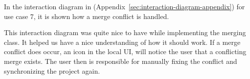 In the interaction diagram in (Appendix~\ref{sec:interaction-diagram-appendix}) for use case 7, it is shown how a merge conflict is handled. 

This interaction diagram was quite nice to have while implementing the merging class. It helped us have a nice understanding of how it should work. If
a merge conflict does occur, an icon in the local UI, will notice the user that a conflicting merge exists. The user then is responsible for manually 
fixing the conflict and synchronizing the project again. 

